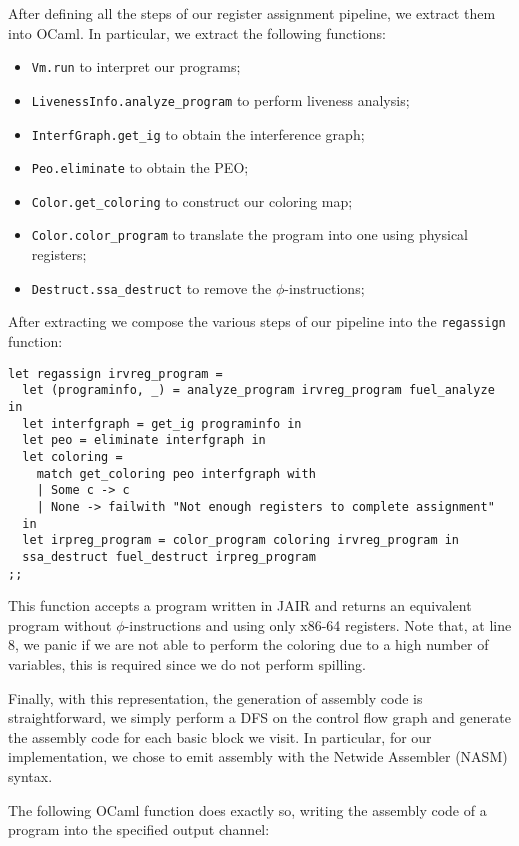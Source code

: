 After defining all the steps of our register assignment pipeline, we extract them into OCaml.
In particular, we extract the following functions:
\begin{itemize}
  \item \texttt{Vm.run} to interpret our programs;
  \item \texttt{LivenessInfo.analyze\_program} to perform liveness analysis;
  \item \texttt{InterfGraph.get\_ig} to obtain the interference graph;
  \item \texttt{Peo.eliminate} to obtain the PEO;
  \item \texttt{Color.get\_coloring} to construct our coloring map;
  \item \texttt{Color.color\_program} to translate the program into one using physical registers;
  \item \texttt{Destruct.ssa\_destruct} to remove the $\phi$-instructions;
\end{itemize}

After extracting we compose the various steps of our pipeline into the \texttt{regassign} function:

\begin{lstlisting}[style=OCaml]
let regassign irvreg_program =
  let (programinfo, _) = analyze_program irvreg_program fuel_analyze in
  let interfgraph = get_ig programinfo in
  let peo = eliminate interfgraph in
  let coloring =
    match get_coloring peo interfgraph with
    | Some c -> c
    | None -> failwith "Not enough registers to complete assignment"
  in
  let irpreg_program = color_program coloring irvreg_program in
  ssa_destruct fuel_destruct irpreg_program
;;
\end{lstlisting}

This function accepts a program written in JAIR and returns an equivalent program without $\phi$-instructions and using only x86-64 registers.
Note that, at line 8, we panic if we are not able to perform the coloring due to a high number of variables, this is required since we do not perform spilling.

Finally, with this representation, the generation of assembly code is straightforward, we simply perform a DFS on the control flow graph and generate the assembly code for each basic block we visit.
In particular, for our implementation, we chose to emit assembly with the Netwide Assembler (NASM) syntax.

The following OCaml function does exactly so, writing the assembly code of a program into the specified output channel:


